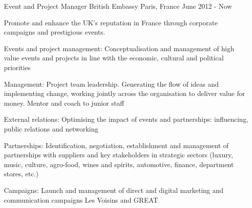 \documentclass[11pt, a4paper]{awesome-cv}
\begin{document}
\begin{cventries}
	\cventry
	{Event and Project Manager}
	{British Embassy}
	{Paris, France}
	{June 2012 - Now}
	{
		\begin{cvitems}  %
			\item Promote and enhance the UK’s reputation in France through corporate campaigns and prestigious events.
			\vspace{1em}
			\item Events and project management: Conceptualisation and management of high value events and projects in line with the economic, cultural and political priorities
			\item Management: Project team leadership. Generating the flow of ideas and implementing change, working jointly across the organisation to deliver value for money. Mentor and coach to junior staff
			\item External relations: Optimising the impact of events and partnerships: influencing, public relations and networking
			\item Partnerships: Identification, negotiation, establishment and management of partnerships with suppliers and key stakeholders in strategic sectors (luxury, music, culture, agro-food, wines and spirits, automotive, finance, department stores, etc.)
			\item Campaigns: Launch and management of direct and digital marketing and communication campaigns Les Voisins and GREAT			
		\end{cvitems}
	}


\end{cventries}
\end{document}

